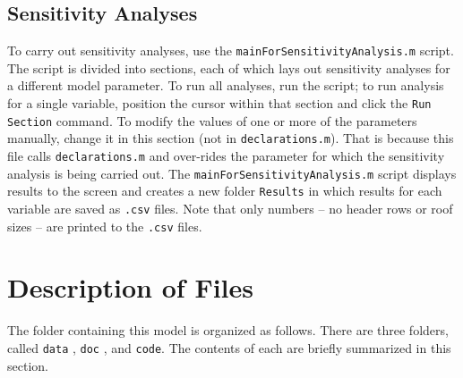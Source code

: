 \documentclass[11pt]{article} %
\newcommand{\fn}[1]{\texttt{#1}} %
\newcommand{\code}[1]{\texttt{#1}} %
\begin{document}
\subsection{Sensitivity Analyses}

To carry out sensitivity analyses, use the \fn{mainForSensitivityAnalysis.m} script. 
The script is divided into sections, each of which lays out sensitivity analyses for a different model parameter. 
To run all analyses, run the script; to run analysis for a single variable, position the cursor within that section and click the \code{Run Section} command.
To modify the values of one or more of the parameters manually, change it in this section (not in \fn{declarations.m}). 
That is because this file calls \fn{declarations.m} and over-rides the parameter for which the sensitivity analysis is being carried out.
The \fn{mainForSensitivityAnalysis.m} script displays results to the screen and creates a new folder \fn{Results} in which results for each variable are saved as \fn{.csv} files.
Note that only numbers -- no header rows or roof sizes -- are printed to the \code{.csv} files.

\section{Description of Files}
The folder containing this model is organized as follows.
There are three folders, called \fn{data} , \fn{doc} , and \fn{code}.
The contents of each are briefly summarized in this section.
\end{document}
